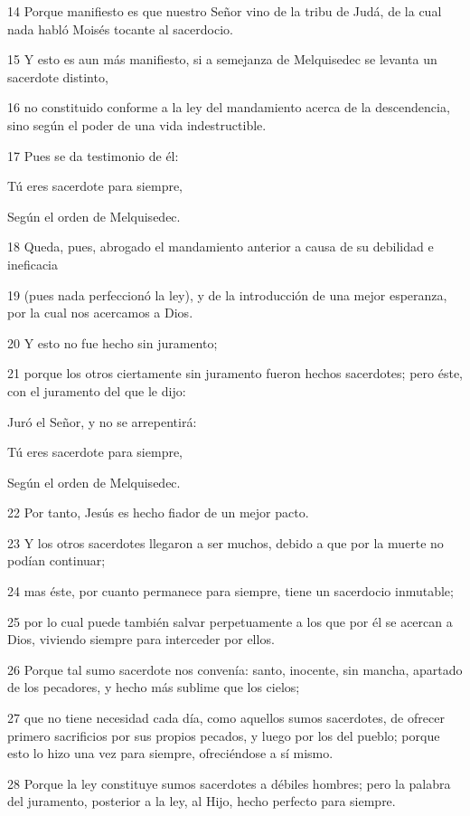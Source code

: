 \par 14 Porque manifiesto es que nuestro Señor vino de la tribu de Judá, de la cual nada habló Moisés tocante al sacerdocio.
\par 15 Y esto es aun más manifiesto, si a semejanza de Melquisedec se levanta un sacerdote distinto,
\par 16 no constituido conforme a la ley del mandamiento acerca de la descendencia, sino según el poder de una vida indestructible.
\par 17 Pues se da testimonio de él:
\par Tú eres sacerdote para siempre,
\par Según el orden de Melquisedec.
\par 18 Queda, pues, abrogado el mandamiento anterior a causa de su debilidad e ineficacia
\par 19 (pues nada perfeccionó la ley), y de la introducción de una mejor esperanza, por la cual nos acercamos a Dios.
\par 20 Y esto no fue hecho sin juramento;
\par 21 porque los otros ciertamente sin juramento fueron hechos sacerdotes; pero éste, con el juramento del que le dijo:
\par Juró el Señor, y no se arrepentirá:
\par Tú eres sacerdote para siempre,
\par Según el orden de Melquisedec.
\par 22 Por tanto, Jesús es hecho fiador de un mejor pacto.
\par 23 Y los otros sacerdotes llegaron a ser muchos, debido a que por la muerte no podían continuar;
\par 24 mas éste, por cuanto permanece para siempre, tiene un sacerdocio inmutable;
\par 25 por lo cual puede también salvar perpetuamente a los que por él se acercan a Dios, viviendo siempre para interceder por ellos.
\par 26 Porque tal sumo sacerdote nos convenía: santo, inocente, sin mancha, apartado de los pecadores, y hecho más sublime que los cielos;
\par 27 que no tiene necesidad cada día, como aquellos sumos sacerdotes, de ofrecer primero sacrificios por sus propios pecados, y luego por los del pueblo; porque esto lo hizo una vez para siempre, ofreciéndose a sí mismo.
\par 28 Porque la ley constituye sumos sacerdotes a débiles hombres; pero la palabra del juramento, posterior a la ley, al Hijo, hecho perfecto para siempre.

